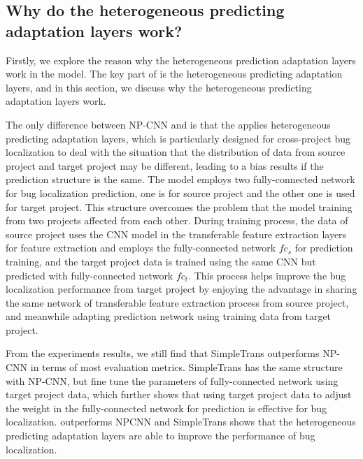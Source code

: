 \subsection{Why do the heterogeneous predicting adaptation layers work? }
Firstly, we explore the reason why the heterogeneous prediction adaptation layers work in the \TRANPCNN model. The key part of \TRANPCNN is the heterogeneous predicting adaptation layers, and in this section, we discuss why the heterogeneous predicting adaptation layers work. 

The only difference between NP-CNN and \TRANPCNN is that the \TRANPCNN applies heterogeneous predicting adaptation layers, which is particularly designed for cross-project bug localization to deal with the situation that the distribution of data from source project and target project may be different, leading to a bias results if the prediction structure is the same. The \TRANPCNN model employs two fully-connected network for bug localization prediction, one is for source project and the other one is used for target project. This structure overcomes the problem that the model training from two projects affected from each other. During training process, the data of source project uses the CNN model in the transferable feature extraction layers  for feature extraction and employs the fully-connected network $fc_s$ for prediction training, and the target project data is trained using the same CNN but predicted with fully-connected network $fc_t$. This process helps improve the bug localization performance from target project by enjoying the advantage in sharing the same network of transferable feature extraction process from source project, and meanwhile adapting prediction network using training data from target project. 

From the experiments results, we still find that SimpleTrans outperforms NP-CNN in terms of most evaluation metrics. SimpleTrans has the same structure with NP-CNN, but fine tune the parameters of fully-connected network using target project data, which further shows that using target project data to adjust the weight in the fully-connected network for prediction is effective for bug localization. \TRANPCNN outperforms NPCNN and SimpleTrans shows that the heterogeneous predicting adaptation layers are able to improve the performance of bug localization. 

